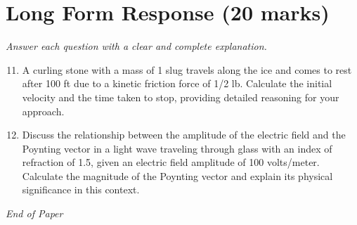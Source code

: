 \documentclass[12pt]{article}
\begin{document}
\section*{Long Form Response (20 marks)}
\textit{Answer each question with a clear and complete explanation.}
\begin{enumerate}[label=\arabic*.]
\setcounter{enumi}{10}
\item A curling stone with a mass of 1 slug travels along the ice and comes to rest after 100 ft due to a kinetic friction force of 1/2 lb. Calculate the initial velocity and the time taken to stop, providing detailed reasoning for your approach.
\item Discuss the relationship between the amplitude of the electric field and the Poynting vector in a light wave traveling through glass with an index of refraction of 1.5, given an electric field amplitude of 100 volts/meter. Calculate the magnitude of the Poynting vector and explain its physical significance in this context.
\end{enumerate}

\vfill
\noindent\textit{End of Paper}
\end{document}
